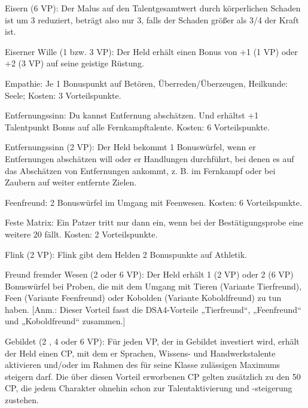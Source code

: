 \begin{description}

\item{Eisern (6 VP):} Der Malus auf den Talentgesamtwert durch körperlichen Schaden ist um 3 reduziert, beträgt also nur 3, falls der Schaden größer als 3/4 der Kraft ist.


\item{Eiserner Wille (1 bzw. 3 VP):} Der Held erhält einen Bonus von +1 (1 VP) oder +2 (3 VP) auf seine geistige Rüstung.

\item{Empathie:} Je 1 Bonuspunkt auf Betören, Überreden/Überzeugen, Heilkunde: Seele; Kosten: 3 Vorteilspunkte.

\item{Entfernungssinn:} Du kannst Entfernung abschätzen. Und erhältst +1 Talentpunkt Bonus auf alle Fernkampftalente. Kosten: 6 Vorteilspunkte.

\item{Entfernungssinn (2 VP):} Der Held bekommt 1 Bonuswürfel, wenn er Entfernungen abschätzen will oder er Handlungen durchführt, bei denen es auf das Abschätzen von Entfernungen ankommt, z. B. im Fernkampf oder bei Zaubern auf weiter entfernte Zielen.

\item{Feenfreund:} 2 Bonuswürfel im Umgang mit Feenwesen. Kosten: 6 Vorteilspunkte.

\item{Feste Matrix:} Ein Patzer tritt nur dann ein, wenn bei der Bestätigungsprobe eine weitere 20 fällt. Kosten: 2 Vorteilspunkte.

\item{Flink (2 VP):} Flink gibt dem Helden 2 Bonuspunkte auf Athletik.

\item{Freund fremder Wesen (2 oder 6 VP):} Der Held erhält 1 (2 VP) oder 2 (6 VP) Bonuswürfel bei Proben, die mit dem Umgang mit Tieren (Variante Tierfreund), Feen (Variante Feenfreund) oder Kobolden (Variante Koboldfreund) zu tun haben.
[Anm.: Dieser Vorteil fasst die DSA4-Vorteile „Tierfreund“, „Feenfreund“ und „Koboldfreund“ zusammen.]

\item{Gebildet (2 , 4 oder 6 VP):} Für jeden VP, der in Gebildet investiert wird, erhält der Held einen CP, mit dem er Sprachen, Wissens- und Handwerkstalente aktivieren und/oder im Rahmen des für seine Klasse zulässigen Maximums steigern darf. Die über diesen Vorteil erworbenen CP gelten zusätzlich zu den 50 CP, die jedem Charakter ohnehin schon zur Talentaktivierung und -steigerung zustehen.


\end{description}
